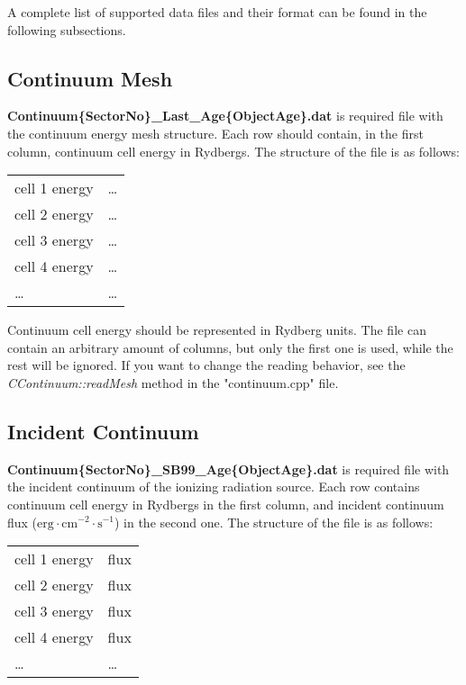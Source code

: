 \documentclass[a4paper]{article}
\begin{document}
A complete list of supported data files and their format can be found in the following subsections.

\subsection{Continuum Mesh}
{\bf Continuum\{SectorNo\}\_Last\_Age\{ObjectAge\}.dat} is required file with the continuum energy mesh structure.
Each row should contain, in the first column, continuum cell energy in Rydbergs. The structure of the file is as follows:
\begin{table}[H]
    \begin{tabular}{ll}
        cell 1 energy & \ldots \\
        cell 2 energy & \ldots \\
        cell 3 energy & \ldots \\
        cell 4 energy & \ldots \\
        \ldots & \ldots \\
    \end{tabular}
\end{table}
Continuum cell energy should be represented in Rydberg units. The file can contain an arbitrary amount of columns,
but only the first one is used, while the rest will be ignored.
If you want to change the reading behavior, see the {\it CContinuum::readMesh} method in the "continuum.cpp" file.
\newpage
\subsection{Incident Continuum}
{\bf Continuum\{SectorNo\}\_SB99\_Age\{ObjectAge\}.dat} is required file with the incident continuum of the ionizing radiation source.
Each row contains continuum cell energy in Rydbergs in the first column, and incident continuum flux ($\mathrm{erg} \cdot \mathrm{cm}^{-2} \cdot \mathrm{s}^{-1}$) in the second one.
The structure of the file is as follows:
\begin{table}[H]
    \begin{tabular}{ll}
        cell 1 energy & flux \\
        cell 2 energy & flux \\
        cell 3 energy & flux \\
        cell 4 energy & flux \\
        \ldots & \ldots \\
    \end{tabular}
\end{table}
\end{document}
